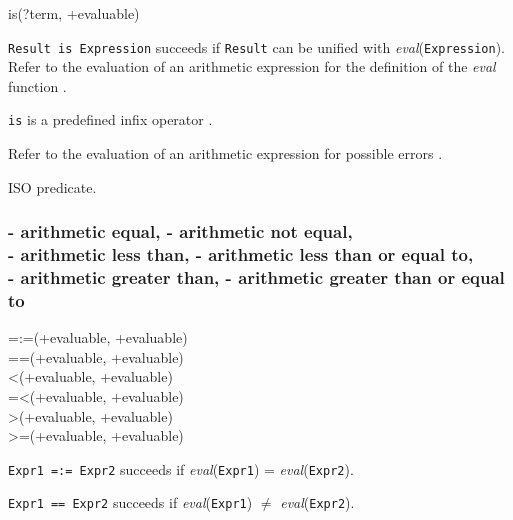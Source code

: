 \begin{TemplatesOneCol}
is(?term, +evaluable)

\end{TemplatesOneCol}

\Description

\texttt{Result is Expression} succeeds if \texttt{Result} can be
unified with \textit{eval}(\texttt{Expression}). Refer to the
evaluation of an arithmetic expression for the definition of the
\textit{eval} function
.

\texttt{is} is a predefined infix operator .

\Errors

Refer to the evaluation of an arithmetic expression for possible errors
.

\Portability

ISO predicate.

\subsubsection{ - arithmetic equal, \label{(=:=)/2}
                - arithmetic not equal, \\
                - arithmetic less than,
                - arithmetic less than or equal to, \\
                - arithmetic greater than,
                - arithmetic greater than or equal to}

\begin{TemplatesTwoCols}
=:=(+evaluable, +evaluable)\\
={\bs}=(+evaluable, +evaluable)\\
<(+evaluable, +evaluable)\\
=<(+evaluable, +evaluable)\\
>(+evaluable, +evaluable)\\
>=(+evaluable, +evaluable)

\end{TemplatesTwoCols}

\Description

\texttt{Expr1 =:= Expr2} succeeds if \textit{eval}(\texttt{Expr1}) =
\textit{eval}(\texttt{Expr2}).

\texttt{Expr1 ={\bs}= Expr2} succeeds if \textit{eval}(\texttt{Expr1})
$\neq$ \textit{eval}(\texttt{Expr2}).

